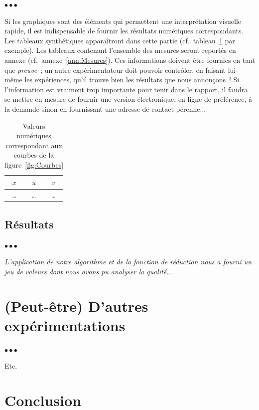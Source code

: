 \documentclass[11pt, french, screen, research-development]{report-rd-info}
\newenvironment{explanation}
{\color{blue}
 \begin{list}{}{\hspace{0.2\textwidth}\color{blue}}\item $\bullet\bullet\bullet$
}
{\end{list}}
\begin{document}
\begin{explanation}
   Si les graphiques sont des éléments qui permettent une interprétation visuelle rapide, il est indispensable de fournir les résultats numériques correspondants.
   Les tableaux synthétiques apparaîtront dans cette partie (cf.~tableau~\ref{tab:Courbes} par exemple).
   Les tableaux contenant l'ensemble des mesures seront reportés en annexe (cf.~annexe~\ref{ann:Mesures}).
   Ces informations doivent être fournies en tant que \emph{preuve}~; un autre expérimentateur doit pouvoir contrôler, en faisant lui-même les expériences, qu'il trouve bien les résultats que nous annonçons~!
   Si l'information est vraiment trop importante pour tenir dans le rapport, il faudra se mettre en mesure de fournir une version électronique, en ligne de préférence, à la demande sinon en fournissant une adresse de contact pérenne...
\end{explanation}

\begin{table}
   \centering
   \begin{tabular}{|c||c|c|}
      \hline
      $x$ & $u$ & $v$\\
      \hline
      \hline
      \ldots & \ldots & \ldots\\
      \hline
   \end{tabular}
   \caption{Valeurs numériques correspondant aux courbes de la figure~\ref{fig:Courbes}}
   \label{tab:Courbes}
\end{table}

\subsection{Résultats}

\begin{explanation}
   \emph{L'application de notre algorithme et de la fonction de réduction nous a fourni un jeu de valeurs dont nous avons pu analyser la qualité...}
\end{explanation}

\section{(Peut-être) D'autres expérimentations}

\begin{explanation}
   Etc.
\end{explanation}

\section{Conclusion}
\end{document}

